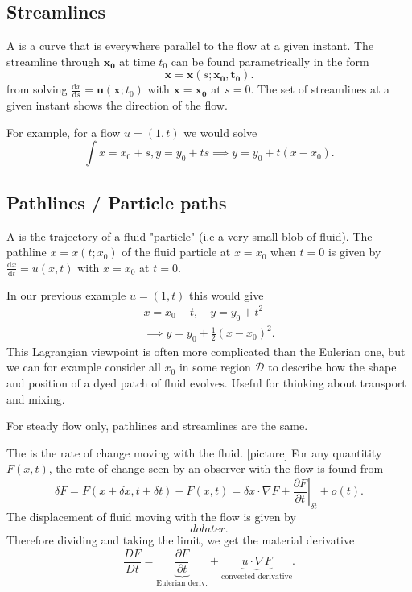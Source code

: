 \documentclass[a4paper]{scrartcl}
\begin{document}
\subsection{Streamlines}
\begin{definition}[Streamline]
     A  is a curve that is everywhere parallel to the flow at a given instant. The streamline through $\bm{x_0 } $ at time $t_0 $ can be found parametrically in the form \[
     \bm{x} =\bm{x} (s; \bm{x_0 } , \bm{t_0 } )
     .\] from solving $\frac{\mathrm{d}x}{\mathrm{d}s}=\bm{u} (\bm{x};t_0 )$ with $\bm{x} =\bm{x_0 } $ at $s=0$. The set of streamlines at a given instant shows the direction of the flow.
\end{definition}
For example, for a flow $u= (1,t)$ we would solve \[
\int x = x_0 +s, y=y_0 +ts \implies y=y_0 +t (x-x_0 )
.\] 
\subsection{Pathlines / Particle paths}
\begin{definition}
     A  is the trajectory of a fluid "particle" (i.e a very small blob of fluid). The pathline $x=x (t;x_0 )$ of the fluid particle at $x=x_0 $ when $t=0$ is given by $\frac{\mathrm{d}x}{\mathrm{d}t}=u (x,t)$ with $x=x_0 $ at $t=0$.
\end{definition}
In our previous example $u= (1,t)$ this would give 
\begin{align*}
    x=x_0 +t, \quad y=y_0 +t^2 \\
    \implies y=y_0 + \frac{1}{2} (x-x_0)^2.
\end{align*}
This Lagrangian viewpoint is often more complicated than the Eulerian one, but we can for example consider all $x_0 $ in some region $\mathcal{D}$ to describe how the shape and position of a dyed patch of fluid evolves. Useful for thinking about transport and mixing.
\begin{remark}
     For steady flow only, pathlines and streamlines are the same. 
\end{remark}
\begin{definition}
     The  is the rate of change moving with the fluid. [picture] For any quantitity $F (x,t)$, the rate of change seen by an observer with the flow is found from \[
     \delta F =F (x+\delta x, t+\delta t)-F (x,t)=\delta x \cdot \nabla F +\left.\frac{\partial F}{\partial t}\right|_{\delta t}+o (t)
     .\] 
     The displacement of fluid moving with the flow is given by \[
     do later
     .\] Therefore dividing and taking the limit, we get the material derivative \[
     \frac{DF}{Dt}=\underbrace{\frac{\partial F}{\partial t}}_{\text{Eulerian deriv.} } + \underbrace{u \cdot \nabla F}_{\text{convected derivative} } 
     .\] 
\end{definition}
\end{document}
